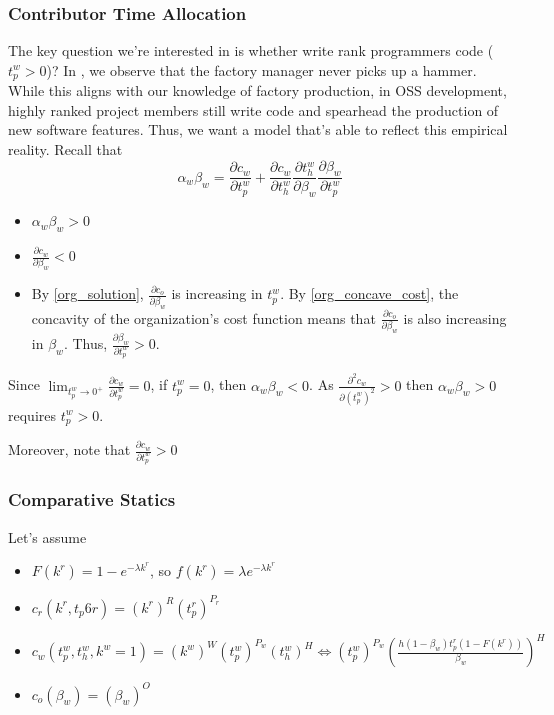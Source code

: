 \documentclass[source/paper/main.tex]{subfiles}
\begin{document}
\subsubsection{Contributor Time Allocation}
The key question we're interested in is whether write rank programmers code ($t_p^w>0$)? In \cite{garicano_hierarchies_2000}, we observe that the factory manager never picks up a hammer. While this aligns with our knowledge of factory production, in OSS development, highly ranked project members still write code and spearhead the production of new software features. Thus, we want a model that's able to reflect this empirical reality. 
Recall that $$\alpha_w \beta_w = \frac{\partial c_w}{\partial t_p^w} + \frac{\partial c_w}{\partial t_h^w}\frac{\partial t_h^w}{\partial \beta_w}\frac{\partial \beta_w}{\partial t_p^w}$$
\begin{itemize}
    \item $\alpha_w \beta_w>0$ 
    \item $\frac{\partial c_w}{\partial \beta_w} < 0$
    \item By \ref{org_solution}, $\frac{\partial c_o}{\partial \beta_w}$ is increasing in $t_p^w$. By \ref{org_concave_cost}, the concavity of the organization's cost function means that $\frac{\partial c_o}{\partial \beta_w}$ is also increasing in $\beta_w$. Thus, $\frac{\partial \beta_w}{\partial t_p^w} > 0$.
\end{itemize}
Since $\lim_{t_p^w \to 0^+} \frac{\partial c_w}{\partial t_p^w} = 0$, if $t_p^w = 0$, then $\alpha_w\beta_w < 0$. As $\frac{\partial^2 c_w}{\partial (t_p^w)^2}>0$ then $\alpha_w \beta_w>0$ requires $t_p^w>0$. 

Moreover, note that $\frac{\partial c_w}{\partial t_p^w}>0$

\subsubsection{Comparative Statics}
Let's assume
\begin{itemize}
    \item $F(k^r) = 1-e^{-\lambda k^r}$, so $f(k^r) = \lambda e^{-\lambda k^r}$
    \item $c_r(k^r, t_p6r) = (k^r)^R(t_p^r)^{P_r}$
    \item $c_w(t_p^w, t_h^w,k^w=1) = (k^w)^W(t_p^w)^{P_w}(t_h^w)^H \iff  (t_p^w)^{P_w}(\frac{h (1-\beta_w) t_p^r(1-F(k^r))}{\beta_w})^H $
    \item $c_o(\beta_w) = (\beta_w)^O $

\end{itemize}
\end{document}
